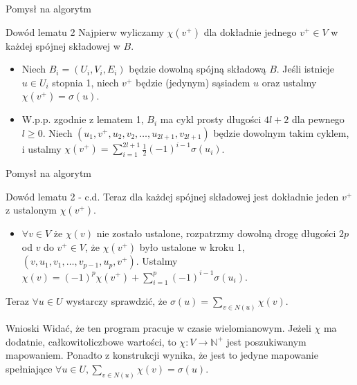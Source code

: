 \documentclass{beamer}
\newcommand{\N}{\mathbb{N}}
\begin{document}
		\begin{frame}{Pomysł na algorytm}
            \begin{block}{Dowód lematu 2}
                Najpierw wyliczamy $ \chi(v^{+}) $ dla dokładnie jednego $ v^{+} \in V $ w każdej spójnej składowej w $ B $.
                \begin{itemize}
                    \item Niech $ B_i = (U_i,V_i,E_i) $ będzie dowolną spójną składową $ B $. Jeśli istnieje $ u \in U_i $ stopnia 1, niech $ v^{+} $ będzie (jedynym) sąsiadem $ u $ oraz ustalmy $ \chi(v^{+}) = \sigma(u) $.
                    \pause \item W.p.p. zgodnie z lematem 1, $ B_i $ ma cykl prosty długości $ 4l + 2 $ dla pewnego $ l \geq 0 $.
                        Niech $ \left( u_1,v^{+},u_2,v_2, \dots, u_{2l+1}, v_{2l+1} \right) $ będzie dowolnym takim cyklem, i ustalmy $ \chi(v^{+}) = \sum_{i=1}^{2l+1}\frac{1}{2}(-1)^{i-1}\sigma(u_i) $.
                \end{itemize}
            \end{block}
        \end{frame}
        \begin{frame}{Pomysł na algorytm}
            \begin{block}{Dowód lematu 2 - c.d.}
                Teraz dla każdej spójnej składowej jest dokładnie jeden $ v^{+} $ z ustalonym $ \chi(v^{+}) $.
                \pause
                \begin{itemize}
                    \item $ \forall v \in V $ że $ \chi(v) $ nie zostało ustalone, rozpatrzmy dowolną drogę długości $ 2p $ od $ v $ do $ v^{+} \in V $, że $ \chi(v^{+}) $ było ustalone w kroku 1, $ \left( v,u_1,v_1, \dots, v_{p-1},u_p,v^{+} \right) $. Ustalmy $ \chi(v) = (-1)^p\chi(v^{+}) + \sum_{i=1}^{p}(-1)^{i-1}\sigma(u_i) $.
                \end{itemize}
                Teraz $ \forall u \in U $ wystarczy sprawdzić, że $ \sigma(u) = \sum_{v \in N(u)}\chi(v) $.
            \end{block}
            \begin{block}{Wnioski}
                Widać, że ten program pracuje w czasie wielomianowym.
                \newline
                Jeżeli $ \chi $ ma dodatnie, całkowitoliczbowe wartości, to $ \chi : V \rightarrow \N^{+} $ jest poszukiwanym mapowaniem.
                \newline
                Ponadto z konstrukcji wynika, że jest to jedyne mapowanie spełniające $ \forall u \in U, \sum_{v \in N(u)}\chi(v) = \sigma(u) $.
            \end{block}
		\end{frame}
\end{document}
